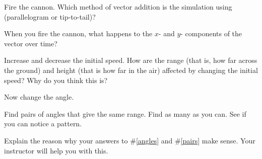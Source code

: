 \documentclass[10pt]{exam}
\begin{document}
\begin{questions}
  
\question
  Fire the cannon.  Which method of vector addition is the simulation using (parallelogram or tip-to-tail)?
  \vspace{4em}

\question
  When you fire the cannon, what happens to the $x$- and $y$- components of the vector over time?
  \vs

\question
  Increase and decrease the initial speed. How are the range (that is, how far across the ground) and height (that is how far in the air) affected by changing the initial speed? Why do you think this is?
  \vs

\pagebreak

\question
  Now change the angle. \label{angles}


\question
  Find pairs of angles that give the same range.  Find as many as you can.  See if you can notice a pattern.
  \vs[3] \label{pairs}

\question
  Explain the reason why your answers to \#\ref{angles} and \#\ref{pairs} make sense.  Your instructor will help you with this.
  \vs[3]




\end{questions}
\end{document}

